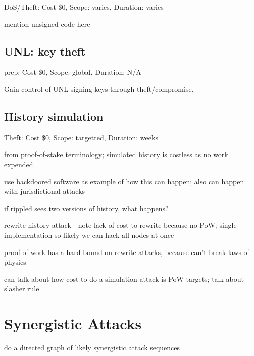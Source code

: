 \documentclass{article}
\begin{document}
DoS/Theft: Cost \$0, Scope: varies, Duration: varies

mention unsigned code here


\subsection{UNL: key theft}

prep: Cost \$0, Scope: global, Duration: N/A

Gain control of UNL signing keys through theft/compromise. 


\subsection{History simulation}

Theft: Cost \$0, Scope: targetted, Duration: weeks

from proof-of-stake terminology; simulated history is costless as no work
expended.

use backdoored software as example of how this can happen; also can happen with
jurisdictional attacks

if rippled sees two versions of history, what happens?

rewrite history attack - note lack of cost to rewrite because no PoW; single
implementation so likely we can hack all nodes at once

proof-of-work has a hard bound on rewrite attacks, because can't break laws of
physics

can talk about how cost to do a simulation attack is PoW targets; talk about slasher rule


\section{Synergistic Attacks}

do a directed graph of likely synergistic attack sequences




\end{document}
